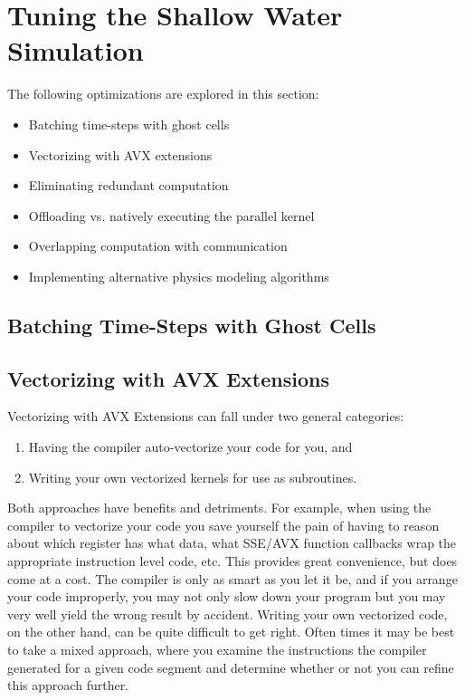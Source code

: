 
\section{Tuning the Shallow Water Simulation}
\label{sec-tune}

The following optimizations are explored in this section:

\begin{itemize}
  \item Batching time-steps with ghost cells
  \item Vectorizing with AVX extensions
  \item Eliminating redundant computation
  \item Offloading vs. natively executing the parallel kernel
  \item Overlapping computation with communication
  \item Implementing alternative physics modeling algorithms
\end{itemize}

\subsection{Batching Time-Steps with Ghost Cells}
\label{sec-tune-batching}

\subsection{Vectorizing with AVX Extensions}
\label{sec-tune-vectorizing}

\noindent Vectorizing with AVX Extensions can fall under two general categories:

\begin{enumerate}[1.]
    \item Having the compiler auto-vectorize your code for you, and
    \item Writing your own vectorized kernels for use as subroutines.
\end{enumerate}

Both approaches have benefits and detriments.  For example, when using the compiler to vectorize your code you save yourself the pain of having to reason about which register has what data, what SSE/AVX function callbacks wrap the appropriate instruction level code, etc.  This provides great convenience, but does come at a cost.  The compiler is only as smart as you let it be, and if you arrange your code improperly, you may not only slow down your program but you may very well yield the wrong result by accident.  Writing your own vectorized code, on the other hand, can be quite difficult to get right.  Often times it may be best to take a mixed approach, where you examine the instructions the compiler generated for a given code segment and determine whether or not you can refine this approach further.

